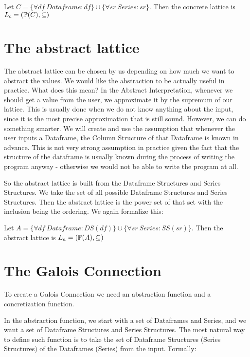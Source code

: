 \begin{defn}

    Let $C = \{\forall df \: Dataframe: df\} \cup \{\forall sr \: Series: sr\}$.
    Then the concrete lattice is $L_c = (\mathbb{P}(C), \subseteq)$
\end{defn}


\section{The abstract lattice}

The abstract lattice can be chosen by us depending on how much we want to abstract the values.
We would like the abstraction to be actually useful in practice.
What does this mean?
In the Abstract Interpretation, whenever we should get a value from the user, we approximate it by the supremum of our
lattice.
This is usually done when we do not know anything about the input, since it is the most precise approximation that is
still sound.
However, we can do something smarter.
We will create and use the assumption that whenever the user inputs a Dataframe, the Column Structure of that Dataframe
is known in advance.
This is not very strong assumption in practice given the fact that the structure of the dataframe is usually known
during the process of writing the program anyway - otherwise we would not be able to write the program at all.

So the abstract lattice is built from the Dataframe Structures and Series Structures.
We take the set of all possible Dataframe Structures and Series Structures.
Then the abstract lattice is the power set of that set with the inclusion being the ordering.
We again formalize this:

\begin{defn}

    Let $A = \{\forall df\: Dataframe: DS(df)\} \cup \{\forall sr \: Series: SS(sr)\}$.
    Then the abstract lattice is $L_a = (\mathbb{P}(A), \subseteq)$ %
\end{defn}

\section{The Galois Connection}

To create a Galois Connection we need an abstraction function and a concretization function.

In the abstraction function, we start with a set of Dataframes and Series, and we want a set of Dataframe Structures and
Series Structures.
The most natural way to define such function is to take the set of Dataframe Structures (Series Structures) of the
Dataframes (Series) from the input.
Formally:

